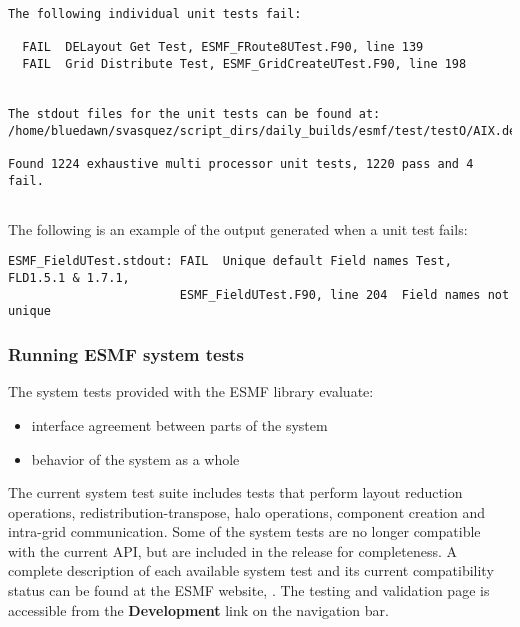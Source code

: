 \begin{verbatim}
The following individual unit tests fail:

  FAIL  DELayout Get Test, ESMF_FRoute8UTest.F90, line 139                                                                                                                                                                                                       
  FAIL  Grid Distribute Test, ESMF_GridCreateUTest.F90, line 198                                                                                                                                                                                                 


The stdout files for the unit tests can be found at:
/home/bluedawn/svasquez/script_dirs/daily_builds/esmf/test/testO/AIX.default.64.default

Found 1224 exhaustive multi processor unit tests, 1220 pass and 4 fail.


\end{verbatim}

The following is an example of the output generated when a unit test fails:
\begin{verbatim}
ESMF_FieldUTest.stdout: FAIL  Unique default Field names Test, FLD1.5.1 & 1.7.1,
                        ESMF_FieldUTest.F90, line 204  Field names not unique
\end{verbatim}

\subsubsection{Running ESMF system tests}
\label{SystemTestDescription}

The system tests provided with the ESMF library evaluate:
\begin{itemize}
\item interface agreement between parts of the system
\item behavior of the system as a whole
\end{itemize}

The current system test suite includes tests that perform layout
reduction operations, redistribution-transpose, halo operations,
component creation and intra-grid communication.  Some of the system
tests are no longer compatible with the current API, but are included
in the release for completeness.  A complete description of each
available system test and its current compatibility status can be
found at the ESMF website,
.  
The testing
and validation page is accessible from the {\bf Development} 
link on the navigation bar.

